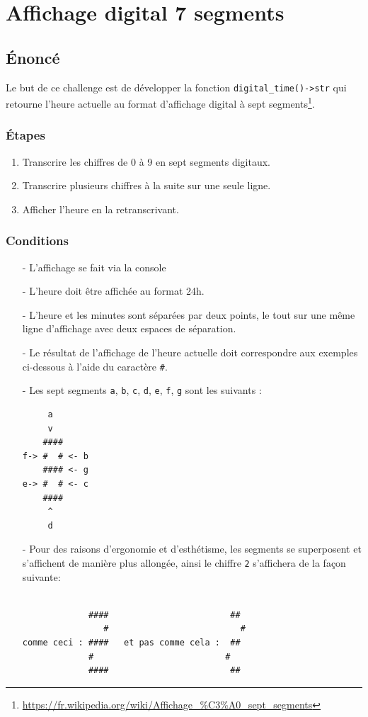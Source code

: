 \chapter{Affichage digital 7 segments}
\vspace{2cm}
\section{Énoncé}
Le but de ce challenge est de développer la fonction \texttt{digital\_time()->str} qui retourne l'heure actuelle au format d'affichage digital à sept segments\footnote{\url{https://fr.wikipedia.org/wiki/Affichage_\%C3\%A0_sept_segments}}.
\medskip

\subsection*{Étapes}
\begin{enumerate}
	\item Transcrire les chiffres de 0 à 9 en sept segments digitaux.
	\item Transcrire plusieurs chiffres à la suite sur une seule ligne.
	\item Afficher l'heure en la retranscrivant.
\end{enumerate}
\medskip

\subsection*{Conditions}
\begin{itemize}
	\item[-] L'affichage se fait via la console
	\item[-] L'heure doit être affichée au format 24h.
	\item[-] L'heure et les minutes sont séparées par deux points, le tout sur une même ligne d'affichage avec deux espaces de séparation.
	\item[-] Le résultat de l'affichage de l'heure actuelle doit correspondre aux exemples ci-dessous à l'aide du caractère \og \texttt{\#}\fg{}.
	\item[-] Les sept segments \texttt{a}, \texttt{b}, \texttt{c}, \texttt{d}, \texttt{e}, \texttt{f}, \texttt{g} sont les suivants :
	\newpage
	
	\begin{verbatim}
     a
     v 
    ####   
f-> #  # <- b
    #### <- g
e-> #  # <- c
    ####
     ^
     d
	\end{verbatim}
	\item[-] Pour des raisons d'ergonomie et d'esthétisme, les segments se superposent et s'affichent de manière plus allongée, ainsi le chiffre \texttt{2} s'affichera de la façon suivante:
	\begin{verbatim}
	
             ####                        ##
                #                          #
comme ceci : ####   et pas comme cela :  ## 
             #                          #
             ####                        ##	
	\end{verbatim}
\end{itemize}
\medskip

